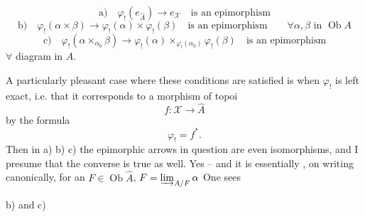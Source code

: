 
\[
\text{a)}\quad \varphi_!(e_{\widehat A})\longrightarrow e_{\mathcal X}\quad\text{is an epimorphism}
\]
\[
\text{b)}\quad \varphi_!(\alpha\times\beta)\longrightarrow
\varphi_!(\alpha)\times\varphi_!(\beta)\quad\text{is an epimorphism}
\qquad \forall\alpha,\beta\text{ in }\operatorname{Ob}A
\]
\[
\text{c)}\quad \varphi_!(\alpha\times_{\alpha_0}\beta)\longrightarrow
\varphi_!(\alpha)\times_{\varphi_!(\alpha_0)}\varphi_!(\beta)\quad\text{is an epimorphism}
\]
$\forall$ diagram
in $A$.

A particularly pleasant case where these conditions are satisfied is when $\varphi_!$ is left exact, i.e. that it corresponds  to a morphism of topoi
\[
f:\mathcal X\longrightarrow\widehat A
\]
by the formula
\[
\varphi_!=f^*.
\]
Then in a) b) c) the epimorphic arrows in question are even isomorphisms, and I presume that the converse is true as well. Yes -- and it is essentially , on writing canonically, for an $F\in\operatorname{Ob}\widehat A$, $F=\varinjlim_{A/F}\alpha$ \unsure{$\ldots$} One sees

 b) and c)

